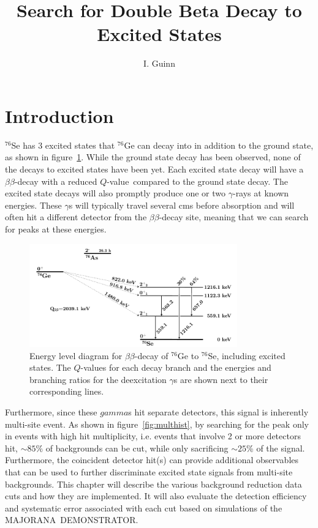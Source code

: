 \documentclass[notitlepage,rmp,aps,10pt]{revtex4-1}
\newcommand{\MJ}{M{\footnotesize AJORANA}}
\newcommand{\Demo}{D{\footnotesize EMON\-STRAT\-OR}}
\newcommand{\MJD}{\MJ\ \Demo}
\newcommand{\bb}{${\beta \beta}$}
\newcommand{\Qval}{$Q$-value}
\newcommand{\iso}[2]{$^{#1}$#2}
\newcommand{\Ge}[1]{\iso{#1}{Ge}}
\newcommand{\Se}[1]{\iso{#1}{Se}}
\newcommand{\msmd}{multi-site event}
\begin{document}
\graphicspath{{./pics/}{../ch3/pics/}{../ch4/pics/}{../ch5/pics/}{../appAllResults/pics/}}

\title{Search for Double Beta Decay to Excited States}
\author{I. Guinn}

\pagestyle{uniheader}
\maketitle
\vspace*{-1.5cm}
\tableofcontents
\thispagestyle{uniheader}

\section{Introduction}
\Se{76} has 3 excited states that \Ge{76} can decay into in addition to the ground state, as shown in figure~\ref{fig:Ge76BBLevelDiagram}.
While the ground state decay has been observed, none of the decays to excited states have been yet.
Each excited state decay will have a \bb -decay with a reduced \Qval\ compared to the ground state decay.
The excited state decays will also promptly produce one or two $\gamma$-rays at known energies.
These $\gamma$s will typically travel several cms before absorption and will often hit a different detector from the \bb -decay site, meaning that we can search for peaks at these energies.
\\
\begin{figure}[h]
  \centering
  \includegraphics[width=0.8\textwidth]{leveldiagram}
  \caption[Energy level diagram for \Ge{76} \bb to \Se{76}]{\label{fig:Ge76BBLevelDiagram}
    Energy level diagram for \bb-decay of \Ge{76} to \Se{76}, including excited states. The \Qval s for each decay branch and the energies and branching ratios for the deexcitation $\gamma$s are shown next to their corresponding lines.
  }
\end{figure}


Furthermore, since these $gamma$s hit separate detectors, this signal is inherently \msmd.
As shown in figure~\ref{fig:multhist}, by searching for the peak only in events with high hit multiplicity, i.e. events that involve 2 or more detectors hit, $\sim85\%$ of backgrounds can be cut, while only sacrificing $\sim25$\% of the signal.
Furthermore, the coincident detector hit(s) can provide additional observables that can be used to further discriminate excited state signals from multi-site backgrounds.
This chapter will describe the various background reduction data cuts and how they are implemented.
It will also evaluate the detection efficiency and systematic error associated with each cut based on simulations of the \MJD.
\end{document}
